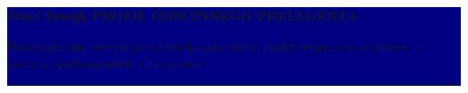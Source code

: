 \documentclass[9pt,a4paper]{article}
\begin{document}
\color{ink}

\noindent
\colorbox{navy}{%
  \parbox{\dimexpr\textwidth-2\fboxsep\relax}{%
    \vspace{0.34em}
    {\fontsize{24}{26}\selectfont\bfseries\color{white} Józef Szwejk}
    \hfill
    {\fontsize{8.5}{10}\selectfont\bfseries\color{gold}
      PROFIL GOŚCINNEGO PRELEGENTA}\par
    \vspace{0.10em}
    {\fontsize{9.2}{11}\selectfont\color{white}
      Doświadczenia zwykłego człowieka jako żywy punkt wyjścia
      do rozmowy o historii, społeczeństwie i literaturze}\par
    \vspace{0.18em}
    {\color{gold}\rule{\linewidth}{1.1pt}}\par
    \vspace{0.20em}
  }%
}

\vspace{0.26em}
\end{document}
